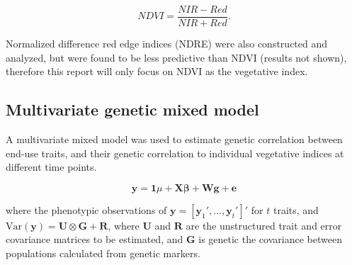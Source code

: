\documentclass[12pt, letterpaper]{article}
\begin{document}
\begin{equation}
	NDVI = \frac{NIR - Red}{NIR + Red}.
\end{equation}

Normalized difference red edge indices (NDRE) were also constructed and analyzed, but were found to be less predictive than NDVI (results not shown), therefore this report will only focus on NDVI as the vegetative index. 


\subsection{Multivariate genetic mixed model}



A multivariate mixed model was used to estimate genetic correlation between end-use traits, and their genetic correlation to individual vegetative indices at different time points. 

\begin{equation} \label{mt}
	 \mathbf{y} = \mathbf{1} \mu + \mathbf{X} \boldsymbol{\beta} + \mathbf{W}\mathbf{g} + \mathbf{e} 
\end{equation}

where the phenotypic observations of $\mathbf{y} = [\mathbf{y}_1', \ldots, \mathbf{y}_t']'$ for $t$ traits, and $\text{Var}(\mathbf{y}) = \mathbf{U} \otimes \mathbf{G} + \mathbf{R}$, where $\mathbf{U}$ and $\mathbf{R}$ are the unstructured trait and error covariance matrices to be estimated, and $\mathbf{G}$ is genetic the covariance between populations calculated from genetic markers.
 
\end{document}
